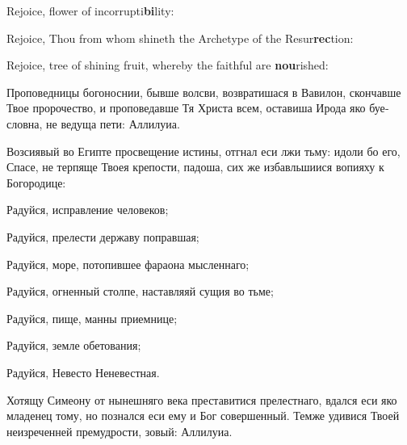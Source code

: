 \PeopleRejoice Rejoice, flower of incorrupti\textbf{bi}lity:


Rejoice, Thou from whom shineth the Archetype of the Resur\textbf{rec}tion:


Rejoice, tree of shining fruit, whereby the faithful are \textbf{nou}rished:


\pagebreak

\begin{russian}



  \Ierei Проповедницы богоноснии, бывше волсви, возвратишася в Вавилон, скончавше Твое пророчество, и проповедавше Тя Христа всем, оставиша Ирода яко буесловна, не ведуща пети: Аллилуиа.


  \Ierei Возсиявый во Египте просвещение истины, отгнал еси лжи тьму: идоли бо его, Спасе, не терпяще Твоея крепости, падоша, сих же избавльшиися вопияху к Богородице:

  Радуйся, исправление человеков;


  Радуйся, прелести державу поправшая;


  Радуйся, море, потопившее фараона мысленнаго;


  Радуйся, огненный столпе, наставляяй сущия во тьме;


  Радуйся, пище, манны приемнице;


  Радуйся, земле обетования;


  Радуйся, Невесто Неневестная.


  \Ierei Хотящу Симеону от нынешняго века преставитися прелестнаго, вдался еси яко младенец тому, но познался еси ему и Бог совершенный. Темже удивися Твоей неизреченней премудрости, зовый: Аллилуиа.


\end{russian}
